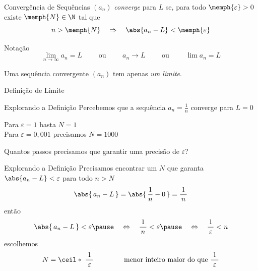 \begin{frame}{Convergência de Sequências}
    $(a_n)$ \emph{converge} para $L$ se, para todo $\memph{\varepsilon}>0$
    existe $\memph{N}\in \N$ tal que
    \[
    	n>\memph{N} \quad \Rightarrow  \quad \abs{a_n-L}<\memph{\varepsilon}
    \]

    \pause
    \vspace{\baselineskip}
    Notação
    \[\lim_{n\to \infty} a_n=L \qquad\text{ ou }\qquad a_n\to L \qquad\text{ ou }\qquad \lim a_n=L\]

    \pause
    \vspace{\baselineskip}
    Uma sequência convergente $(a_n)$ tem apenas \emph{um limite}.
\end{frame}

\begin{frame}{Definição de Limite}
  \centering
  \scalebox{0.9}{}
\end{frame}

\begin{frame}{Explorando a Definição}
    Percebemos que a sequência \(a_n = \frac{1}{n}\) converge para $L = 0$

    \pause
    \vspace{\baselineskip}
    Para $\varepsilon=1$     \tabto{28mm} basta      \tabto{50mm} $N=1$    \\
    Para $\varepsilon=0,001$ \tabto{28mm} precisamos \tabto{50mm} $N=1000$

    \pause
    \vspace{\baselineskip}
    Quantos passos precisamos que garantir uma precisão de $\varepsilon$?

\end{frame}

\begin{frame}{Explorando a Definição}
    Precisamos encontrar um $N$ que garanta
    \(\abs{a_n-L}<\varepsilon\)
    para todo $n>N$
    \pause
    \[\abs{\,a_n-L\,} = \abs{\,\frac{1}{n}-0\,} = \frac{1}{\,n\,} \]
    \pause
    então
    \[
        \abs{\,a_n-L\,}<\varepsilon
        \pause
        \quad\Leftrightarrow\quad
        \frac{1}{\,n\,} < \varepsilon
        \pause
        \quad\Leftrightarrow\quad
        \frac{1}{\,\varepsilon\,} < n
    \]
    \pause
    escolhemos
    \[
        N = \ceil*{\;\frac{1}{\;\varepsilon\;}\;}
        \qquad\qquad\text{menor inteiro maior do que } \frac{1}{\;\varepsilon\;}
    \]

\end{frame}

